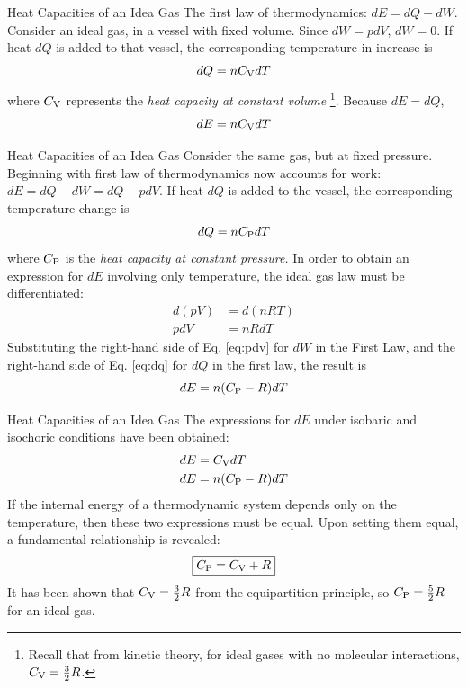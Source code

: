 \documentclass{beamer}
\begin{document}
\begin{frame}{Heat Capacities of an Idea Gas}
\small
The first law of thermodynamics: $dE = dQ - dW$.  Consider an ideal gas, in a vessel with fixed volume.  Since $dW = pdV$, $dW=0$.  If heat $dQ$ is added to that vessel, the corresponding temperature in increase is
\begin{equation}
dQ = n C_{\rm V} dT
\end{equation}
where $C_{\rm V}$ represents the \textit{heat capacity at constant volume} \footnote{Recall that from kinetic theory, for ideal gases with no molecular interactions, $C_{\rm V} = \frac{3}{2}R$.}.  Because $dE = dQ$,
\begin{equation}
dE = n C_{\rm V} dT
\end{equation}
\end{frame}

\begin{frame}{Heat Capacities of an Idea Gas}
\small
Consider the same gas, but at fixed pressure.  Beginning with first law of thermodynamics now accounts for work: \\ $dE = dQ - dW = dQ - pdV$.  If heat $dQ$ is added to the vessel, the corresponding temperature change is
\begin{equation}
dQ = n C_{\rm P} dT \label{eq:dq}
\end{equation}
where $C_{\rm P}$ is the \textit{heat capacity at constant pressure.}  In order to obtain an expression for $dE$ involving only temperature, the ideal gas law must be differentiated:
\begin{align}
d(pV) &= d(nRT) \\
pdV &= nRdT \label{eq:pdv}
\end{align}
Substituting the right-hand side of Eq. \ref{eq:pdv} for $dW$ in the First Law, and the right-hand side of Eq. \ref{eq:dq} for $dQ$ in the first law, the result is
\begin{equation}
dE = n(C_{\rm P} - R)dT
\end{equation}
\end{frame}

\begin{frame}{Heat Capacities of an Idea Gas}
The expressions for $dE$ under isobaric and isochoric conditions have been obtained:
\begin{align}
dE &= C_{\rm V} dT \\
dE &= n(C_{\rm P} - R)dT
\end{align}
If the internal energy of a thermodynamic system depends only on the temperature, then these two expressions must be equal.  Upon setting them equal, a fundamental relationship is revealed:
\begin{equation}
\boxed{
C_{\rm P} = C_{\rm V} + R}
\end{equation}
It has been shown that $C_{\rm V} = \frac{3}{2}R$ from the equipartition principle, so $C_{\rm P} = \frac{5}{2}R$ for an ideal gas.
\end{frame}
\end{document}

